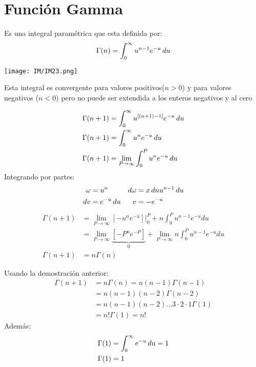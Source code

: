 \documentclass[
	12pt, %
	fleqn, %
	a4paper, %
	oneside, %
]{LegrandOrangeBook}
\begin{document}
\section{Función Gamma}
\begin{definition}
Es una integral paramétrica que esta definida por:
\begin{equation}
\Gamma (n)=\int_0^{\infty}u^{n-1}e^{-u}\mathop{}\!d u
\label{eq:Fgamma}
\end{equation}
\begin{center}
\texttt{[image: IM/IM23.png]}
\end{center}
Esta integral es convergente para valores positivos($n>0$) y para valores negativos ($n<0$) pero no puede ser extendida a los enteros negativos y al cero
\end{definition}
\begin{theorem}[Demostrar $\Gamma(n+1)=n\Gamma(n)\forall n>0$]
\begin{align*}
\Gamma(n+1)&=\int_0^{\infty}u^{\left[(n+1)-1\right]}e^{-u}\mathop{}\!d u\\
\Gamma(n+1)&=\int_0^{\infty}u^ne^{-u}\mathop{}\!d u\\
\Gamma(n+1)&=\lim_{P\to\infty}\int_0^Pu^ne^{-u}\mathop{}\!d u
\end{align*}
Integrando por partes:
\begin{displaymath}
\begin{alignedat}{2}
  \omega&=u^n \quad & \mathop{}\!d \omega &= x\mathop{}\!d nu^{n-1}\mathop{}\!d u\\
  \mathop{}\!d v &= e^{-u}\mathop{}\!d u \quad & v &= -e^{-u}
\end{alignedat}
\end{displaymath}
\begin{align*}
\Gamma (n+1)&=\lim_{P\to \infty}\left[-u^ne^{-u}\right]\Big|_0^P+n\int_0^Pu^{n-1}e^{-u}du\\
&=\lim_{P\to\infty}\underbrace{\left[-P^ne^{-P}\right]}_{0}+\lim_{P\to\infty}n\int_0^Pu^{n-1}e^{-u}du\\
\Gamma (n+1)&=n\Gamma(n)
\end{align*}
\end{theorem}
\begin{theorem}[Demostrar $\Gamma(n+1)=n!\forall n\in\mathcal{Z}^+$]
Usando la demostración anterior:
\begin{align*}
\Gamma(n+1)&=n\Gamma(n)=n(n-1)\Gamma(n-1)\\
&=n(n-1)(n-2)\Gamma(n-2)\\
&=n(n-1)(n-2)\ldots 3\cdot 2\cdot 1\Gamma(1)\\
&=n!\Gamma(1)=n!
\end{align*}
Además:
\begin{align*}
\Gamma(1)&=\int_0^{\infty}e^{-u}\mathop{}\!d u=1\\
\Gamma(1)&=1
\end{align*}
\end{theorem}
\end{document}
